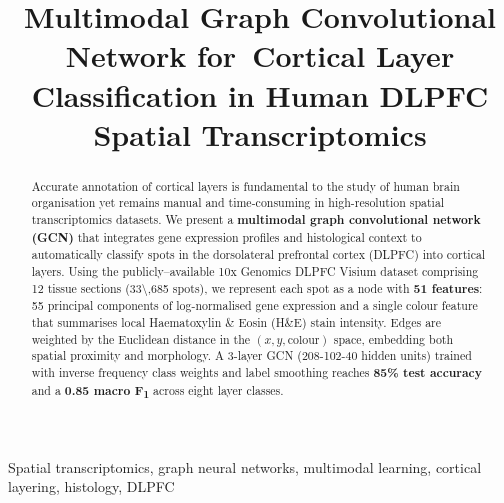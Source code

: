 \documentclass[conference]{IEEEtran}
\begin{document}
\title{Multimodal Graph Convolutional Network for\ Cortical Layer Classification 
in Human DLPFC Spatial Transcriptomics\\}

\author{
}

\maketitle

\begin{abstract}
Accurate annotation of cortical layers is fundamental to the study of human brain 
organisation yet remains manual and time-consuming in high-resolution spatial 
transcriptomics datasets. We present a \textbf{multimodal graph convolutional 
network (GCN)} that integrates gene expression profiles and histological context 
to automatically classify spots in the dorsolateral prefrontal cortex (DLPFC) 
into cortical layers. Using the publicly--available 10x Genomics DLPFC Visium 
dataset comprising \num{12} tissue sections (\num{33\,685} spots), we represent 
each spot as a node with \textbf{51 features}: \num{55} principal components of 
log-normalised gene expression and a single colour feature that summarises local 
Haematoxylin \& Eosin (H\&E) stain intensity. Edges are weighted by the 
Euclidean distance in the \((x,y,\text{colour})\) space, embedding both spatial 
proximity and morphology. A 3-layer GCN (208-102-40 hidden units) trained with 
inverse frequency class weights and label smoothing reaches \textbf{85\% test 
accuracy} and a \textbf{0.85 macro F\textsubscript{1}} across eight layer classes.
\end{abstract}

\begin{IEEEkeywords}
Spatial transcriptomics, graph neural networks, multimodal learning, 
cortical layering, histology, DLPFC
\end{IEEEkeywords}

\end{document}
